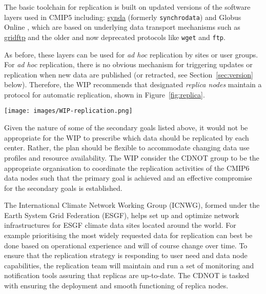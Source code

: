 \documentclass[gmd,manuscript]{copernicus}
\newcommand{\pipref}[1] {\citep{ref:#1}}
\newcommand{\figref}[1] {\mbox{Figure   \ref{fig:#1}}}
\newcommand{\secref}[1] {\mbox{Section  \ref{sec:#1}}}
\begin{document}
The basic toolchain for replication is built on updated versions of
the software layers used in CMIP5 including:
\href{https://github.com/Prodiguer/synda}{synda} (formerly
\texttt{synchrodata}) and Globus Online \pipref{chardetal2015}, which
are based on underlying data transport mechanisms such as
\href{https://goo.gl/Z8xcfE}{gridftp} and the older and now deprecated
protocols like \texttt{wget} and \texttt{ftp}.

As before, these layers can be used for \emph{ad hoc} replication by
sites or user groups. For \emph{ad hoc} replication, there is no
obvious mechanism for triggering updates or replication when new data
are published (or retracted, see \secref{version} below). Therefore,
the WIP recommends that designated \emph{replica nodes} maintain a
protocol for automatic replication, shown in \figref{replica}.

\begin{figure*}
  \begin{center}
    \texttt{[image: images/WIP-replication.png]}
  \end{center}
  \caption{CMIP6 replication from data nodes to replica centers and
    between replica centers coordinated by a CMIP6 replication team.}
  \label{fig:replica}
\end{figure*}

Given the nature of some of the secondary goals listed above, it would
not be appropriate for the WIP to prescribe which data should be
replicated by each center. Rather, the plan should be flexible to
accommodate changing data use profiles and resource availability. The
WIP consider the CDNOT group to be the appropriate organisation to
coordinate the replication activities of the CMIP6 data nodes such
that the primary goal is achieved and an effective compromise for the
secondary goals is established.

The International Climate Network Working Group (ICNWG), formed under
the Earth System Grid Federation (ESGF), helps set up and optimize
network infrastructures for ESGF climate data sites located around the
world. For example prioritising the most widely requested data for
replication can best be done based on operational experience and will
of course change over time. To ensure that the replication strategy is
responding to user need and data node capabilities, the replication
team will maintain and run a set of monitoring and notification tools
assuring that replicas are up-to-date. The CDNOT is tasked with
ensuring the deployment and smooth functioning of replica nodes.
\end{document}
